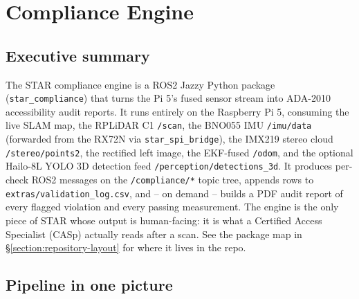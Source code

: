 
\section{Compliance Engine}
\label{section:compliance-engine}

\subsection{Executive summary}

The STAR compliance engine is a ROS2 Jazzy Python package
(\texttt{star\_compliance}) that turns the Pi 5's fused sensor stream
into ADA-2010 accessibility audit reports. It runs entirely on the
Raspberry Pi 5, consuming the live SLAM map, the RPLiDAR C1 \texttt{/scan},
the BNO055 IMU \texttt{/imu/data} (forwarded from the RX72N via
\texttt{star\_spi\_bridge}), the IMX219 stereo cloud
\texttt{/stereo/points2}, the rectified left image, the EKF-fused
\texttt{/odom}, and the optional Hailo-8L YOLO 3D detection feed
\texttt{/perception/detections\_3d}. It produces per-check ROS2 messages
on the \texttt{/compliance/*} topic tree, appends rows to
\texttt{extras/validation\_log.csv}, and -- on demand -- builds a PDF
audit report of every flagged violation and every passing measurement.
The engine is the only piece of STAR whose output is human-facing: it
is what a Certified Access Specialist (CASp) actually reads after a
scan. See the package map in \S\ref{section:repository-layout} for
where it lives in the repo.

\subsection{Pipeline in one picture}

